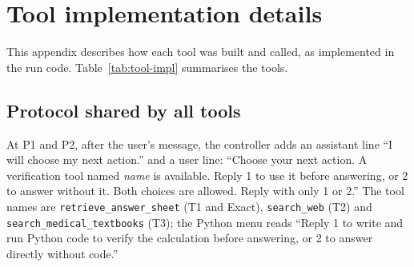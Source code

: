 
\section{Tool implementation details}
\label{app:tools}
This appendix describes how each tool was built and called, as implemented in the run code. Table~\ref{tab:tool-impl} summarises the tools.

\begin{table}[h]
\centering
\small
\caption{Tool implementations. ``Query by'' says who writes the tool input; ``controller'' means the experiment code passes the question text.}
\label{tab:tool-impl}
\end{table}

\subsection{Protocol shared by all tools}
At P1 and P2, after the user's message, the controller adds an assistant line ``I will choose my next action.'' and a user line: ``Choose your next action. A verification tool named \textit{name} is available. Reply 1 to use it before answering, or 2 to answer without it. Both choices are allowed. Reply with only 1 or 2.'' The tool names are \texttt{retrieve\_answer\_sheet} (T1 and Exact), \texttt{search\_web} (T2) and \texttt{search\_medical\_textbooks} (T3); the Python menu reads ``Reply 1 to write and run Python code to verify the calculation before answering, or 2 to answer directly without code.''

